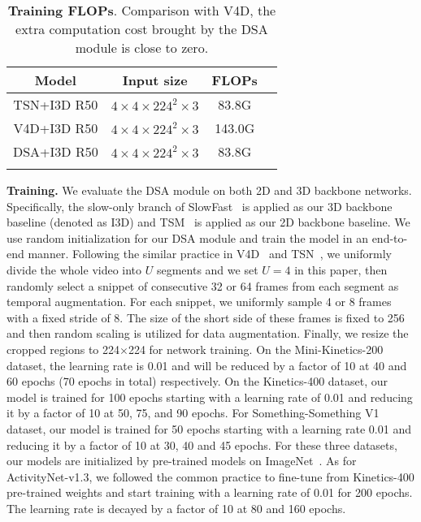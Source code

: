 \documentclass[sigconf]{acmart}
\def\x{$\times$}
\begin{document}
\begin{table*}
\begin{subtable}[th]{0.33\textwidth}
	    \end{subtable}
	    \hspace{3mm}
	    \begin{subtable}[h]{0.32\textwidth}
	    \centering
        \caption{\textbf{Training FLOPs}. Comparison with V4D, the extra computation cost brought by the DSA module is close to zero.}	    
\setlength{\tabcolsep}{2.0pt}
	    	\begin{tabular}{c|c|cc}
            \shline
            Model  &   Input size & FLOPs\\
            \hline
            {TSN+I3D R50} &  {$4\times4\times224^2\times3$} & 83.8G\\
            {V4D+I3D R50} &  {$4\times4\times224^2\times3$}  & 143.0G\\ \hline
            {DSA+I3D R50} &  {$4\times4\times224^2\times3$} &  83.8G \\
            \shline
            \end{tabular}\label{tab:ablation:flops}
	    \end{subtable}		
\label{tab:ablations}
	\end{table*} \textbf{Training.} 
We evaluate the DSA module on both 2D and 3D backbone networks.
Specifically, the slow-only branch of SlowFast~\cite{slowfast} is applied as our 3D backbone baseline (denoted as I3D) and TSM~\cite{tsm} is applied as our 2D backbone baseline. 
We use random initialization for our DSA module and train the model in an end-to-end manner. 
Following the similar practice in V4D~\cite{zhang2020v4d} and TSN~\cite{tsn}, we uniformly divide the whole video into $U$ segments and we set $U=4$ in this paper, then randomly select a snippet of consecutive 32 or 64 frames from each segment as temporal augmentation. For each snippet, we uniformly sample 4 or 8 frames with a fixed stride of 8. The size of the short side of these frames is fixed to 256 and then random scaling is utilized for data augmentation. Finally, we resize the cropped regions to 224\x224 for network training. 
On the Mini-Kinetics-200 dataset, the learning rate is 0.01 and will be reduced by a factor of 10 at 40 and 60 epochs (70 epochs in total) respectively. 
On the Kinetics-400 dataset, our model is trained for 100 epochs starting with a learning rate of 0.01 and reducing it by a factor of 10 at 50, 75, and 90 epochs.
For Something-Something V1 dataset, our model is trained for 50 epochs starting with a learning rate 0.01 and reducing it by a factor of 10 at 30, 40 and 45 epochs.
For these three datasets, our models are initialized by pre-trained models on ImageNet~\cite{deng2009imagenet}. 
As for ActivityNet-v1.3, we followed the common practice to fine-tune from Kinetics-400 pre-trained weights and start training with a learning rate of 0.01 for 200 epochs. The learning rate is decayed by a factor of 10 at 80 and 160 epochs.
\end{document}
